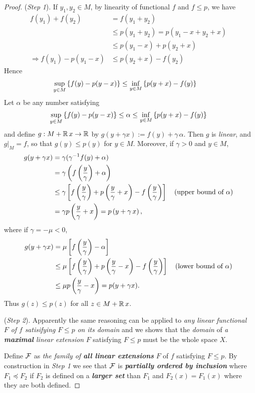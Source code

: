 \documentclass[11pt]{article}
\begin{document}
\begin{itemize}
\begin{proof}
(\emph{Step 1}). If $y_1, y_2 \in M$, by linearity of functional $f$ and $f \le p$, we have 
\begin{align*}
f(y_1) + f(y_2) &= f(y_1 + y_2) \\
& \le p(y_1 + y_2) = p(y_1 - x + y_2 + x) \\
& \le p(y_1 - x) + p(y_2 + x) \\
\Rightarrow f(y_1) - p(y_1 - x) &\le p(y_2 + x) - f(y_2)
\end{align*} 
Hence 
\begin{align*}
\sup_{y \in M}\left\{f(y) - p(y - x)\right\} &\le \inf_{y \in M}\left\{p(y + x) - f(y)\right\}
\end{align*}
Let $\alpha$ be any number satisfying 
\begin{align*}
\sup_{y \in M}\left\{f(y) - p(y - x)\right\} \le \alpha \le \inf_{y \in M}\left\{p(y + x) - f(y)\right\}
\end{align*} and define $g: M + {\mathbb R}\,x \rightarrow {\mathbb R}$ by $g(y + \gamma x) := f(y) + \gamma\,\alpha$. Then $g$ is \emph{linear}, and $g|_{M} = f$, so that $g(y) \le p(y)$ for $y \in M$. Moreover, if $\gamma >0$ and $y \in M$,
\begin{align*}
g(y + \gamma x) &=\gamma(\gamma^{-1}f(y) + \alpha)\\
&=  \gamma\left(f\left(\frac{y}{\gamma}\right) + \alpha\right)\\
&\le \gamma \left[f\left(\frac{y}{\gamma}\right) +  p\left(\frac{y}{\gamma} + x\right) - f\left(\frac{y}{\gamma}\right)\right]\quad (\text{upper bound of }\alpha)\\
&= \gamma p\left(\frac{y}{\gamma} + x\right)  = p\left(y + \gamma\,x\right),
\end{align*} where if $\gamma = - \mu < 0$, 
\begin{align*}
g(y + \gamma x) &= \mu\left[f\left(\frac{y}{\gamma}\right) - \alpha\right] \\
&\le \mu\left[f\left(\frac{y}{\gamma}\right) + p\left(\frac{y}{\gamma} - x\right) - f\left(\frac{y}{\gamma}\right) \right] \quad (\text{lower bound of }\alpha)\\
&\le \mu  p\left(\frac{y}{\gamma} - x\right) = p(y + \gamma x).
\end{align*} Thus $g(z) \le p(z)$ for all $z \in M + {\mathbb R}\,x$.

(\emph{Step 2}). Apparently the same reasoning can be applied to \emph{any linear functional $F$ of $f$ satisifying $F \le p$ on its domain} and we shows that the \emph{domain} of \emph{a \textbf{maximal} linear extension} $F$ satisfying $F \le p$ must be the whole space $X$. 

Define ${\mathcal F}$ as \emph{the family of \textbf{all linear extensions}} $F$ of $f$ satisfying $F \le p$. By construction in \emph{Step 1} we see that ${\mathcal F}$ is \emph{\textbf{partially ordered by inclusion}} where $F_1 \preceq F_2$ if $F_2$ is defined on a \emph{\textbf{larger set}}
than $F_1$ and $F_2(x) = F_1(x)$ where they are both defined.  


\end{proof}
\end{itemize}
\end{document}
